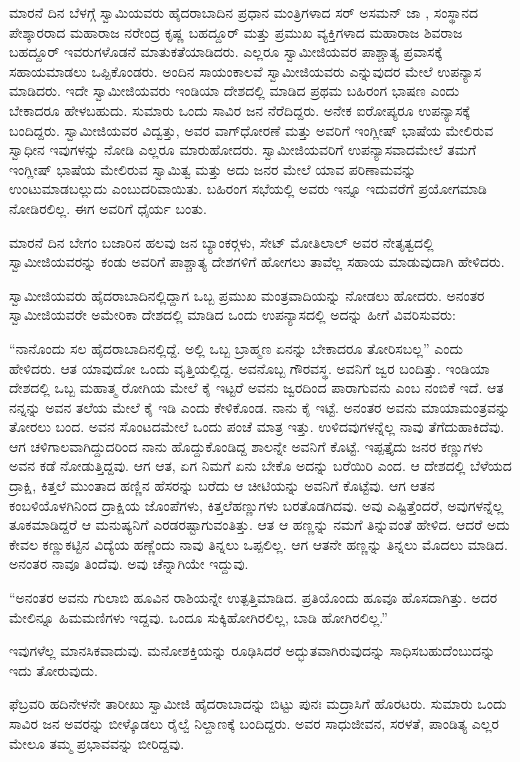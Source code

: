  ಮಾರನೆ ದಿನ ಬೆಳಗ್ಗೆ ಸ್ವಾಮಿಯವರು ಹೈದರಾಬಾದಿನ ಪ್ರಧಾನ ಮಂತ್ರಿಗಳಾದ ಸರ್ ಅಸಮನ್ ಜಾ , ಸಂಸ್ಥಾನದ ಪೇಶ್ಕಾರರಾದ ಮಹಾರಾಜ ನರೇಂದ್ರ ಕೃಷ್ಣ ಬಹದ್ದೂರ್ ಮತ್ತು ಪ್ರಮುಖ ವ್ಯಕ್ತಿಗಳಾದ ಮಹಾರಾಜ ಶಿವರಾಜ ಬಹದ್ದೂರ್ ಇವರುಗಳೊಡನೆ ಮಾತುಕತೆಯಾಡಿದರು. ಎಲ್ಲರೂ ಸ್ವಾಮೀಜಿಯವರ ಪಾಶ್ಚಾತ್ಯ ಪ್ರವಾಸಕ್ಕೆ ಸಹಾಯಮಾಡಲು ಒಪ್ಪಿಕೊಂಡರು. ಅಂದಿನ ಸಾಯಂಕಾಲವೆ ಸ್ವಾಮೀಜಿಯವರು  ಎನ್ನುವುದರ ಮೇಲೆ ಉಪನ್ಯಾಸ ಮಾಡಿದರು. ಇದೇ ಸ್ವಾಮೀಜಿಯವರು ಇಂಡಿಯಾ ದೇಶದಲ್ಲಿ ಮಾಡಿದ ಪ್ರಥಮ ಬಹಿರಂಗ ಭಾಷಣ ಎಂದು ಬೇಕಾದರೂ ಹೇಳಬಹುದು. ಸುಮಾರು ಒಂದು ಸಾವಿರ ಜನ ನೆರೆದಿದ್ದರು. ಅನೇಕ ಐರೋಪ್ಯರೂ ಉಪನ್ಯಾಸಕ್ಕೆ ಬಂದಿದ್ದರು. ಸ್ವಾಮೀಜಿಯವರ ವಿದ್ವತ್ತು, ಅವರ ವಾಗ್‍ಧೋರಣೆ ಮತ್ತು ಅವರಿಗೆ ಇಂಗ್ಲೀಷ್ ಭಾಷೆಯ ಮೇಲಿರುವ ಸ್ವಾಧೀನ ಇವುಗಳನ್ನು ನೋಡಿ ಎಲ್ಲರೂ ಮಾರುಹೋದರು. ಸ್ವಾಮೀಜಿಯವರಿಗೆ ಉಪನ್ಯಾಸವಾದಮೇಲೆ ತಮಗೆ ಇಂಗ್ಲೀಷ್ ಭಾಷೆಯ ಮೇಲಿರುವ ಸ್ವಾಮಿತ್ವ ಮತ್ತು ಅದು ಜನರ ಮೇಲೆ ಯಾವ ಪರಿಣಾಮವನ್ನು ಉಂಟುಮಾಡಬಲ್ಲುದು ಎಂಬುದರಿವಾಯಿತು. ಬಹಿರಂಗ ಸಭೆಯಲ್ಲಿ ಅವರು ಇನ್ನೂ ಇದುವರೆಗೆ ಪ್ರಯೋಗಮಾಡಿ ನೋಡಿರಲಿಲ್ಲ. ಈಗ ಅವರಿಗೆ ಧೈರ್ಯ ಬಂತು.

 ಮಾರನೆ ದಿನ ಬೇಗಂ ಬಜಾರಿನ ಹಲವು ಜನ ಬ್ಯಾಂಕರ್‍ಗಳು, ಸೇಟ್ ಮೋತಿ‍ಲಾಲ್ ಅವರ ನೇತೃತ್ವದಲ್ಲಿ ಸ್ವಾಮೀಜಿಯವರನ್ನು ಕಂಡು ಅವರಿಗೆ ಪಾಶ್ಚಾತ್ಯ ದೇಶಗಳಿಗೆ ಹೋಗಲು ತಾವೆಲ್ಲ ಸಹಾಯ ಮಾಡುವುದಾಗಿ ಹೇಳಿದರು. 

 ಸ್ವಾಮೀಜಿಯವರು ಹೈದರಾಬಾದಿನಲ್ಲಿದ್ದಾಗ ಒಬ್ಬ ಪ್ರಮುಖ ಮಂತ್ರವಾದಿಯನ್ನು ನೋಡಲು ಹೋದರು. ಅನಂತರ ಸ್ವಾಮೀಜಿಯವರೇ ಅಮೇರಿಕಾ ದೇಶದಲ್ಲಿ ಮಾಡಿದ ಒಂದು ಉಪನ್ಯಾಸದಲ್ಲಿ ಅದನ್ನು ಹೀಗೆ ವಿವರಿಸುವರು: 

 “ನಾನೊಂದು ಸಲ ಹೈದರಾಬಾದಿನಲ್ಲಿದ್ದೆ. ಅಲ್ಲಿ ಒಬ್ಬ ಬ್ರಾಹ್ಮಣ ಏನನ್ನು ಬೇಕಾದರೂ ತೋರಿಸಬಲ್ಲ” ಎಂದು ಹೇಳಿದರು. ಆತ ಯಾವುದೋ ಒಂದು ವೃತ್ತಿಯಲ್ಲಿದ್ದ. ಅವನೊಬ್ಬ ಗೌರವಸ್ಥ. ಅವನಿಗೆ ಜ್ವರ ಬಂದಿತ್ತು. ಇಂಡಿಯಾ ದೇಶದಲ್ಲಿ ಒಬ್ಬ ಮಹಾತ್ಮ ರೋಗಿಯ ಮೇಲೆ ಕೈ ಇಟ್ಟರೆ ಅವನು ಜ್ವರದಿಂದ ಪಾರಾಗುವನು ಎಂಬ ನಂಬಿಕೆ ಇದೆ. ಆತ ನನ್ನನ್ನು ಅವನ ತಲೆಯ ಮೇಲೆ ಕೈ ಇಡಿ ಎಂದು ಕೇಳಿಕೊಂಡ. ನಾನು ಕೈ ಇಟ್ಟೆ. ಅನಂತರ ಅವನು ಮಾಯಾಮಂತ್ರವನ್ನು ತೋರಲು ಬಂದ. ಅವನ ಸೊಂಟದಮೇಲೆ ಒಂದು ಪಂಚೆ ಮಾತ್ರ ಇತ್ತು. ಉಳಿದವುಗಳನ್ನೆಲ್ಲ ನಾವು ತೆಗೆದುಹಾಕಿದೆವು. ಆಗ ಚಳಿಗಾಲವಾಗಿದ್ದುದರಿಂದ ನಾನು ಹೊದ್ದುಕೊಂಡಿದ್ದ ಶಾಲನ್ನೇ ಅವನಿಗೆ ಕೊಟ್ಟೆ. ಇಪ್ಪತ್ತೈದು ಜನರ ಕಣ್ಣುಗಳು ಅವನ ಕಡೆ ನೋಡುತ್ತಿದ್ದವು. ಆಗ ಆತ, ಏಗ ನಿಮಗೆ ಏನು ಬೇಕೊ ಅದನ್ನು ಬರೆಯಿರಿ ಎಂದ. ಆ ದೇಶದಲ್ಲಿ ಬೆಳೆಯದ ದ್ರಾಕ್ಷಿ, ಕಿತ್ತಲೆ ಮುಂತಾದ ಹಣ್ಣಿನ ಹೆಸರನ್ನು ಬರೆದು ಆ ಚೀಟಿಯನ್ನು ಅವನಿಗೆ ಕೊಟ್ಟೆವು. ಆಗ ಆತನ ಕಂಬಳಿಯೊಳಗಿನಿಂದ ದ್ರಾಕ್ಷಿಯ ಜೊಂಪೆಗಳು, ಕಿತ್ತಲೆಹಣ್ಣುಗಳು ಬರತೊಡಗಿದವು. ಅವು ಎಷ್ಟಿತ್ತೆಂದರೆ, ಅವುಗಳನ್ನೆಲ್ಲ ತೂಕಮಾಡಿದ್ದರೆ ಆ ಮನುಷ್ಯನಿಗೆ ಎರಡರಷ್ಟಾಗುವಂತಿತ್ತು. ಆತ ಆ ಹಣ್ಣನ್ನು ನಮಗೆ ತಿನ್ನುವಂತೆ ಹೇಳಿದ. ಆದರೆ ಅದು ಕೇವಲ ಕಣ್ಣುಕಟ್ಟಿನ ವಿದ್ಯೆಯ ಹಣ್ಣೆಂದು ನಾವು ತಿನ್ನಲು ಒಪ್ಪಲಿಲ್ಲ. ಆಗ ಆತನೇ ಹಣ್ಣನ್ನು ತಿನ್ನಲು ಮೊದಲು ಮಾಡಿದ. ಅನಂತರ ನಾವೂ ತಿಂದೆವು. ಅವು ಚೆನ್ನಾಗಿಯೇ ಇದ್ದುವು. 

 “ಅನಂತರ ಅವನು ಗುಲಾಬಿ ಹೂವಿನ ರಾಶಿಯನ್ನೇ ಉತ್ಪತ್ತಿಮಾಡಿದ. ಪ್ರತಿಯೊಂದು ಹೂವೂ ಹೊಸದಾಗಿತ್ತು. ಅದರ ಮೇಲಿನ್ನೂ ಹಿಮಮಣಿಗಳು ಇದ್ದವು. ಒಂದೂ ಸುಕ್ಕಿಹೋಗಿರಲಿಲ್ಲ, ಬಾಡಿ ಹೋಗಿರಲಿಲ್ಲ.” 

 ಇವುಗಳೆಲ್ಲ ಮಾನಸಿಕವಾದುವು. ಮನೋಶಕ್ತಿಯನ್ನು ರೂಢಿಸಿದರೆ ಅದ್ಭುತವಾಗಿರುವುದನ್ನು ಸಾಧಿಸಬಹುದೆಂಬುದನ್ನು ಇದು ತೋರುವುದು.

 ಫೆಬ್ರವರಿ ಹದಿನೇಳನೇ ತಾರೀಖು ಸ್ವಾಮೀಜಿ ಹೈದರಾಬಾದನ್ನು ಬಿಟ್ಟು ಪುನಃ ಮದ್ರಾಸಿಗೆ ಹೊರಟರು. ಸುಮಾರು ಒಂದು ಸಾವಿರ ಜನ ಅವರನ್ನು ಬೀಳ್ಕೊಡಲು ರೈಲ್ವೆ ನಿಲ್ದಾಣಕ್ಕೆ ಬಂದಿದ್ದರು. ಅವರ ಸಾಧುಜೀವನ, ಸರಳತೆ, ಪಾಂಡಿತ್ಯ ಎಲ್ಲರ ಮೇಲೂ ತಮ್ಮ ಪ್ರಭಾವವನ್ನು ಬೀರಿದ್ದವು. 

